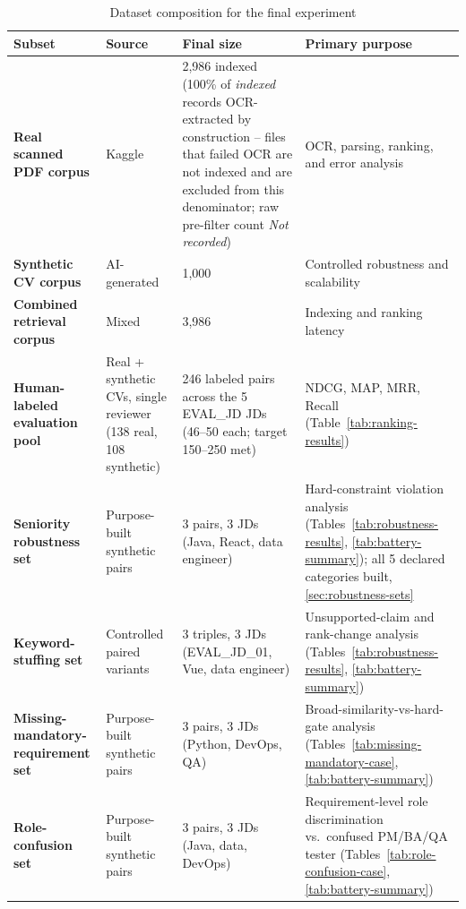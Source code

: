 \documentclass[12pt,a4paper,oneside]{report}
\begin{document}
\begin{table}[htbp]
\centering
\caption{Dataset composition for the final experiment}
\label{tab:dataset-composition}
\begin{tabularx}{\textwidth}{>{\bfseries}p{}p{}p{}X}
\toprule
Subset & Source & Final size & Primary purpose \\
\midrule
Real scanned PDF corpus & Kaggle & 2,986 indexed (100\% of \emph{indexed} records OCR-extracted by construction -- files that failed OCR are not indexed and are excluded from this denominator; raw pre-filter count \emph{Not recorded}) & OCR, parsing, ranking, and error analysis \\
Synthetic CV corpus & AI-generated & 1,000 & Controlled robustness and scalability \\
Combined retrieval corpus & Mixed & 3,986 & Indexing and ranking latency \\
Human-labeled evaluation pool & Real + synthetic CVs, single reviewer (138 real, 108 synthetic) & 246 labeled pairs across the 5 EVAL\_JD JDs (46--50 each; target 150--250 met) & NDCG, MAP, MRR, Recall (Table~\ref{tab:ranking-results}) \\
Seniority robustness set & Purpose-built synthetic pairs & 3 pairs, 3 JDs (Java, React, data engineer) & Hard-constraint violation analysis (Tables~\ref{tab:robustness-results}, \ref{tab:battery-summary}); all 5 declared categories built, \cref{sec:robustness-sets} \\
Keyword-stuffing set & Controlled paired variants & 3 triples, 3 JDs (EVAL\_JD\_01, Vue, data engineer) & Unsupported-claim and rank-change analysis (Tables~\ref{tab:robustness-results}, \ref{tab:battery-summary}) \\
Missing-mandatory-requirement set & Purpose-built synthetic pairs & 3 pairs, 3 JDs (Python, DevOps, QA) & Broad-similarity-vs-hard-gate analysis (Tables~\ref{tab:missing-mandatory-case}, \ref{tab:battery-summary}) \\
Role-confusion set & Purpose-built synthetic pairs & 3 pairs, 3 JDs (Java, data, DevOps) & Requirement-level role discrimination vs.\ confused PM/BA/QA tester (Tables~\ref{tab:role-confusion-case}, \ref{tab:battery-summary}) \\
\bottomrule
\end{tabularx}
\end{table}
\end{document}
